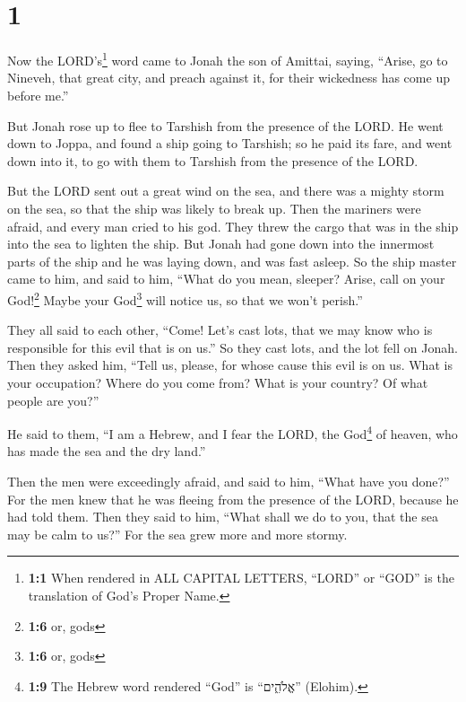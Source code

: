 \hypertarget{section}{%
\section{1}\label{section}}

 Now the LORD's\footnote{\textbf{1:1} When rendered in ALL
  CAPITAL LETTERS, ``LORD'' or ``GOD'' is the translation of God's
  Proper Name.} word came to Jonah the son of Amittai, saying,
 ``Arise, go to Nineveh, that great city, and preach
against it, for their wickedness has come up before me.''

 But Jonah rose up to flee to Tarshish from the presence
of the LORD. He went down to Joppa, and found a ship going to Tarshish;
so he paid its fare, and went down into it, to go with them to Tarshish
from the presence of the LORD.

 But the LORD sent out a great wind on the sea, and there
was a mighty storm on the sea, so that the ship was likely to break up.
 Then the mariners were afraid, and every man cried to his
god. They threw the cargo that was in the ship into the sea to lighten
the ship. But Jonah had gone down into the innermost parts of the ship
and he was laying down, and was fast asleep.  So the ship
master came to him, and said to him, ``What do you mean, sleeper? Arise,
call on your God!\footnote{\textbf{1:6} or, gods} Maybe your
God\footnote{\textbf{1:6} or, gods} will notice us, so that we won't
perish.''

 They all said to each other, ``Come! Let's cast lots,
that we may know who is responsible for this evil that is on us.'' So
they cast lots, and the lot fell on Jonah.  Then they
asked him, ``Tell us, please, for whose cause this evil is on us. What
is your occupation? Where do you come from? What is your country? Of
what people are you?''

 He said to them, ``I am a Hebrew, and I fear the LORD,
the God\footnote{\textbf{1:9} The Hebrew word rendered ``God'' is
  ``אֱלֹהִ֑ים'' (Elohim).} of heaven, who has made the sea and the dry
land.''

 Then the men were exceedingly afraid, and said to him,
``What have you done?'' For the men knew that he was fleeing from the
presence of the LORD, because he had told them.  Then
they said to him, ``What shall we do to you, that the sea may be calm to
us?'' For the sea grew more and more stormy.

